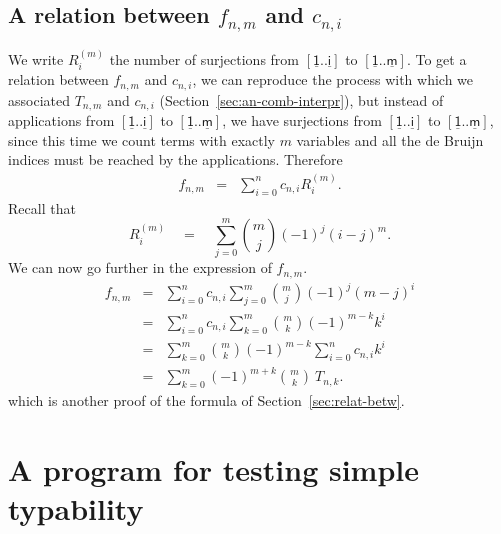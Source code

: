 \documentclass{jfp1}
\newcommand{\Var}[1]{\underline{\mathsf{#1}}}
\begin{document}
\subsection{A relation between $f_{n,m}$ and $c_{n,i}$}
We write $R^{(m)}_i$ the number of surjections from $[\Var{1}..\Var{i}]$ to $[\Var{1}..\Var{m}]$.
To get a relation between $f_{n,m}$ and $c_{n,i}$, we can reproduce the process with
which we associated $T_{n,m}$ and $c_{n,i}$ (Section~\ref{sec:an-comb-interpr}), but
instead of applications from $[\Var{1}..\Var{i}]$ to $[\Var{1}..\Var{m}]$, we have surjections from $[\Var{1}..\Var{i}]$
to $[\Var{1}..\Var{m}]$, since this time we count terms with exactly $m$ variables and all the de
Bruijn indices must be reached by the applications.  Therefore
\begin{eqnarray*}
  f_{n,m} &=& \sum_{i=0}^n c_{n,i} R^{(m)}_i.
\end{eqnarray*}
Recall that
\[R^{(m)}_i \quad = \quad \sum_{j=0}^m {m \choose j} (-1)^j (i-j)^m.\]
We can now go further in the expression of $f_{n,m}$.
\begin{eqnarray*}
   f_{n,m} &=& \sum_{i=0}^n c_{n,i} \sum_{j=0}^m {m\choose j} (-1)^j (m-j)^i\\
   &=&\sum_{i=0}^n c_{n,i} \sum_{k=0}^m {m\choose k} (-1)^{m-k} k^i\\
   &=& \sum_{k=0}^m  {m\choose k} (-1)^{m-k} \sum_{i=0}^n c_{n,i} k^i\\
   &=& \sum_{k=0}^m   (-1)^{m+k} {m\choose k}\ T_{n,k}.
\end{eqnarray*}
which is another proof of the formula of Section~\ref{sec:relat-betw}.

\section{A program for testing simple typability}
\label{sec:typ_prog}
\end{document}
